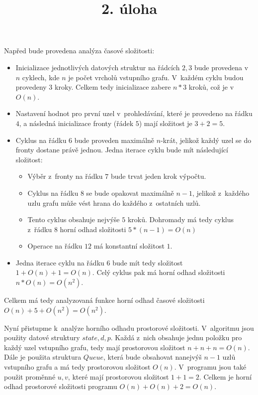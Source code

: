\documentclass[a4paper]{article}
\title {2. úloha}
\begin{document}
\section*{}
Napřed bude provedena analýza časové složitosti:
\begin{itemize}
    \item Inicializace jednotlivých datových struktur na řádcích $2,3$ bude provedena v~$n$ cyklech, kde $n$ je počet vrcholů vstupního grafu.
    V~každém cyklu budou provedeny $3$ kroky.
    Celkem tedy inicializace zabere $n*3$ kroků, což je v~$O(n)$.
    \item Nastavení hodnot pro první uzel v~prohledávání, které je provedeno na řádku $4$, a následná inicializace fronty (řádek $5$) mají
    složitost je $3+2=5$.
    \item Cyklus na řádku $6$ bude proveden maximálně $n$-krát, jelikož každý uzel se do fronty dostane právě jednou.
    Jedna iterace cyklu bude mít následující složitost:
    \begin{itemize}
        \item Výběr z~fronty na řádku $7$ bude trvat jeden krok výpočtu.
        \item Cyklus na řádku $8$ se bude opakovat maximálně $n-1$, jelikož z~každého uzlu grafu může vést hrana do každého z~ostatních uzlů.
        \item Tento cyklus obsahuje nejvýše $5$ kroků.
        Dohromady má tedy cyklus z~řádku $8$ horní odhad složitosti $5*(n-1)=O(n)$
        \item Operace na řádku $12$ má konstantní složitost $1$.
    \end{itemize}
    \item Jedna iterace cyklu na řádku $6$ bude mít tedy složitost $1+O(n)+1=O(n)$.
    Celý cyklus pak má horní odhad složitosti $n*O(n)=O(n^2)$.
\end{itemize}
Celkem má tedy analyzovaná funkce horní odhad časové složitosti $O(n)+5+O(n^2)=O(n^2)$.

Nyní přistupme k~analýze horního odhadu prostorové složitosti.
V~algoritmu jsou použity datové struktury $state, d, p$.
Každá z~nich obsahuje jednu položku pro každý uzel vstupního grafu, tedy mají prostorovou složitost $n+n+n=O(n)$.
Dále je použita struktura $Queue$, která bude obsahovat nanejvýš $n-1$ uzlů vstupního grafu a má tedy prostorovou složitost $O(n)$.
V~programu jsou také použit proměnné $u,v$, které mají prostorovou složitost $1+1=2$.
Celkem je horní odhad prostorové složitosti programu $O(n)+O(n)+2=O(n)$.
\end{document}
